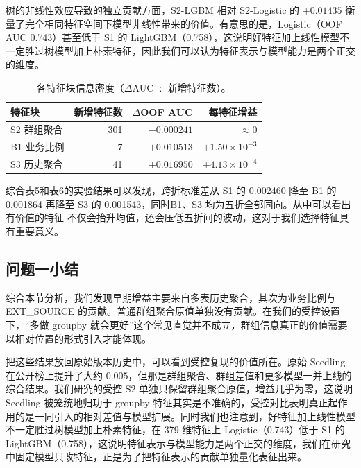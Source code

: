 \documentclass[12pt,UTF8,fontset=windows]{ctexart}
\begin{document}
树的非线性效应导致的独立贡献方面，S2-LGBM 相对 S2-Logistic 的 $+0.01435$ 衡量了完全相同特征空间下模型非线性带来的价值。有意思的是，Logistic（OOF AUC 0.743）甚至低于 S1 的 LightGBM（0.758），这说明好特征加上线性模型不一定胜过树模型加上朴素特征，因此我们可以认为特征表示与模型能力是两个正交的维度。

\begin{table}[h]
\centering\small
\caption{各特征块信息密度（$\Delta$AUC $\div$ 新增特征数）。}\label{tab:rq1-density}
\begin{tabular}{lrrr}
\toprule
特征块 & 新增特征数 & $\Delta$OOF AUC & 每特征增益 \\
\midrule
S2 群组聚合 & 301 & $-0.000241$ & $\approx 0$ \\
B1 业务比例 & 7   & $+0.010513$ & $+1.50\times10^{-3}$ \\
S3 历史聚合 & 41  & $+0.016950$ & $+4.13\times10^{-4}$ \\
\bottomrule
\end{tabular}
\end{table}

综合表5和表6的实验结果可以发现，跨折标准差从 S1 的 0.002460 降至 B1 的 0.001864 再降至 S3 的 0.001543，同时B1、S3 均为五折全部同向。从中可以看出有价值的特征
不仅会抬升均值，还会压低五折间的波动，这对于我们选择特征具有重要意义。

\subsection{问题一小结}

综合本节分析，我们发现早期增益主要来自多表历史聚合，其次为业务比例与 EXT\_SOURCE 的贡献。普通群组聚合原值单独没有贡献。在我们的受控设置下，“多做 groupby 就会更好”这个常见直觉并不成立，群组信息真正的价值需要以相对位置的形式引入才能体现。

把这些结果放回原始版本历史中，可以看到受控复现的价值所在。原始 Seedling 在公开榜上提升了大约 $0.005$，但那是群组聚合、群组差值和更多模型一并上线的综合结果。我们研究的受控 S2 单独只保留群组聚合原值，增益几乎为零，这说明 Seedling 被笼统地归功于 groupby 特征其实是不准确的，受控对比表明真正起作用的是一同引入的相对差值与模型扩展。同时我们也注意到，好特征加上线性模型不一定胜过树模型加上朴素特征，在 379 维特征上 Logistic（0.743）低于 S1 的 LightGBM（0.758），这说明特征表示与模型能力是两个正交的维度，我们在研究中固定模型只改特征，正是为了把特征表示的贡献单独量化表征出来。

\end{document}
